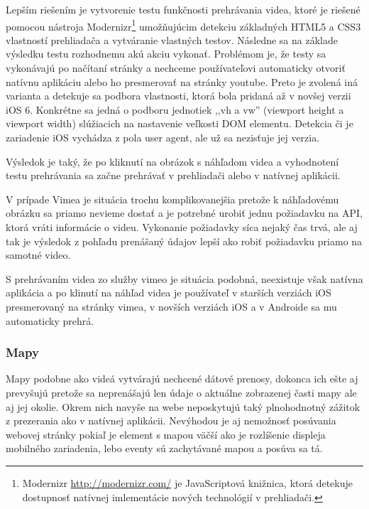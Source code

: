 Lepším riešením je vytvorenie testu funkčnosti prehrávania videa, ktoré je riešené pomocou nástroja Modernizr\footnote{Modernizr \url{http://modernizr.com/} je JavaScriptová knižnica, ktorá detekuje dostupnosť natívnej imlementácie nových technológií v prehliadači.} umožňujúcim detekciu základných HTML5 a CSS3 vlastností prehliadača a vytváranie vlastných testov. Následne sa na základe výsledku testu rozhodnemu akú akciu vykonať. Problémom je, že testy sa vykonávajú po načítaní stránky a nechceme používateľovi automaticky otvoriť natívnu aplikáciu alebo ho presmerovať na stránky youtube. Preto je zvolená iná varianta a detekuje sa podbora vlastnosti, ktorá bola pridaná až v novšej verzii iOS 6. Konkrétne sa jedná o podboru jednotiek ,,vh a vw'' (viewport height a viewport width) slúžiacich na nastavenie veľkosti DOM elementu. Detekcia či je zariadenie iOS vychádza z pola user agent, ale už sa nezisťuje jej verzia.

Výsledok je taký, že po kliknutí na obrázok s náhľadom videa a vyhodnotení testu prehrávania sa začne prehrávať v prehliadači alebo v natívnej aplikácii.

V prípade Vimea je situácia trochu komplikovanejšia pretože k náhľadovému obrázku sa priamo nevieme dostať a je potrebné urobiť jednu požiadavku na API, ktorá vráti informácie o videu. Vykonanie požiadavky síca nejaký čas trvá, ale aj tak je výsledok z pohľadu prenášaný údajov lepší ako robiť požiadavku priamo na samotné video.

S prehrávaním videa zo služby vimeo je situácia podobná, neexistuje však natívna aplikácia a po klinutí na náhľad videa je používateľ v starších verziách iOS presmerovaný na stránky vimea, v novších verziách iOS a v Androide sa mu automaticky prehrá.



\subsubsection{Mapy} %
\label{subsub:mapy}

Mapy podobne ako videá vytvárajú nechcené dátové prenosy, dokonca ich ešte aj prevyšujú pretože sa neprenášajú len údaje o aktuálne zobrazenej časti mapy ale aj jej okolie. Okrem nich navyše na webe neposkytujú taký plnohodnotný zážitok z prezerania ako v natívnej aplikácii. Nevýhodou je aj nemožnosť posúvania webovej stránky pokiaľ je element s mapou väčší ako je rozlíšenie displeja mobilného zariadenia, lebo eventy sú zachytávané mapou a posúva sa tá.

